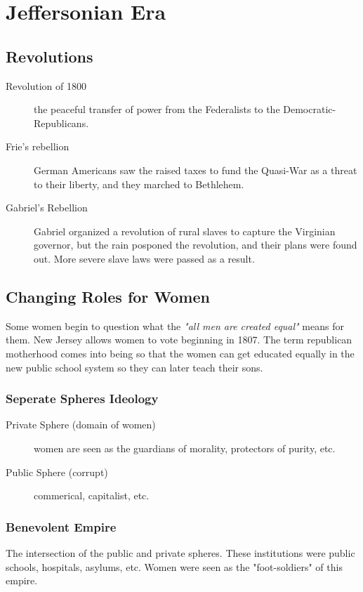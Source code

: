 \chapter{Jeffersonian Era}
\section{Revolutions}
\begin{description}
  \item[Revolution of 1800] the peaceful transfer of power from the Federalists
    to the Democratic-Republicans.
  \item[Frie's rebellion] German Americans saw the raised taxes to fund the
    Quasi-War as a threat to their liberty, and they marched to Bethlehem.
  \item[Gabriel's Rebellion] Gabriel organized a revolution of rural slaves to
    capture the Virginian governor, but the rain posponed the revolution, and
    their plans were found out.  More severe slave laws were passed as a result.
\end{description}

\section{Changing Roles for Women}
Some women begin to question what the \textit{"all men are created equal"} means
for them.  New Jersey allows women to vote beginning in 1807.  The term
republican motherhood comes into being so that the women can get educated
equally in the new public school system so they can later teach their sons.

\subsection{Seperate Spheres Ideology}
\begin{description}
  \item[Private Sphere (domain of women)] women are seen as the guardians of
    morality, protectors of purity, etc.
  \item[Public Sphere (corrupt)] commerical, capitalist, etc.
\end{description}

\subsection{Benevolent Empire}
The intersection of the public and private spheres.  These institutions were
public schools, hospitals, asylums, etc.  Women were seen as the "foot-soldiers"
of this empire.

